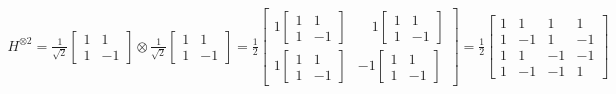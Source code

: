 \begin{align*}
	H^{\otimes 2}
	=
	\frac{1}{\sqrt{2}} \begin{bmatrix}
	1 & 1 \\
	1 & -1
	\end{bmatrix}
	\otimes
	\frac{1}{\sqrt{2}} \begin{bmatrix}
	1 & 1 \\
	1 & -1
	\end{bmatrix}
	=
	\frac{1}{2}\begin{bmatrix}
		1\begin{bmatrix}1 & 1 \\
	1 & -1
	\end{bmatrix} & \quad1\begin{bmatrix}1 & 1 \\
	1 & -1
	\end{bmatrix} \\
	1\begin{bmatrix}1 & 1 \\
	1 & -1
	\end{bmatrix} &
	-1\begin{bmatrix}1 & 1 \\
	1 & -1
	\end{bmatrix}
	\end{bmatrix} =
	\frac{1}{2} \begin{bmatrix}
		1 & 1 & 1 & 1 \\
		1 & -1 & 1 & -1 \\
		1 & 1 & -1 & -1 \\
		1 & -1 & -1 & 1
	\end{bmatrix}
\end{align*}

